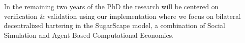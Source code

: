 \documentclass[oneside]{book}
\begin{document}
In the remaining two years of the PhD the research will be centered on verification \& validation using our implementation where we focus on bilateral decentralized bartering in the SugarScape model, a combination of Social Simulation and Agent-Based Computational Economics. 

\clearpage
\tableofcontents
\clearpage















\renewcommand\bibname{References}





\end{document}
